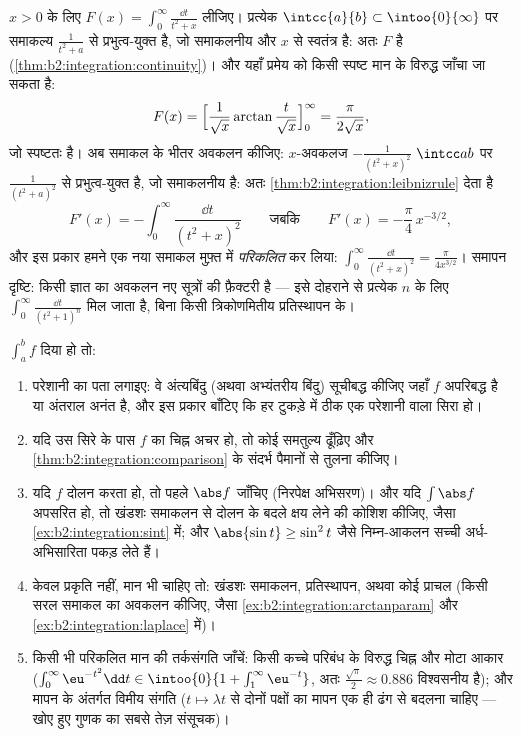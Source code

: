 \begin{example}[किसी सूत्र के विरुद्ध जाँचा गया एक प्राचल समाकल]\label{ex:b2:integration:arctanparam}
$x > 0$ के लिए $F(x) = \displaystyle\int_0^\infty \frac{\dd t}{t^2 + x}$ लीजिए। प्रत्येक $\intcc{a}{b} \subset \intoo{0}{\infty}$ पर समाकल्य $\frac{1}{t^2 + a}$ से प्रभुत्व-युक्त है,
जो समाकलनीय और $x$ से स्वतंत्र है: अतः $F$  है (\cref{thm:b2:integration:continuity})। और यहाँ प्रमेय
को किसी स्पष्ट मान के विरुद्ध जाँचा जा सकता है:
\[
F(x) = \Bigl[\frac{1}{\sqrt x}\arctan\frac{t}{\sqrt
x}\Bigr]_0^\infty = \frac{\pi}{2\sqrt x} ,
\]
जो स्पष्टतः  है। अब समाकल के भीतर अवकलन कीजिए: $x$-अवकलज $-\frac{1}{(t^2+x)^2}$ $\intcc ab$
पर $\frac{1}{(t^2+a)^2}$ से प्रभुत्व-युक्त है, जो समाकलनीय है: अतः \cref{thm:b2:integration:leibnizrule} देता है
\[
F'(x) = -\int_0^\infty \frac{\dd t}{(t^2 + x)^2}
\qquad\text{जबकि}\qquad
F'(x) = -\frac{\pi}{4}\,x^{-3/2} ,
\]
और इस प्रकार हमने एक नया समाकल मुफ़्त में \emph{परिकलित} कर लिया:
$\int_0^\infty\frac{\dd t}{(t^2+x)^2} = \frac{\pi}{4x^{3/2}}$। समापन दृष्टि: किसी ज्ञात  का अवकलन नए सूत्रों की
फ़ैक्टरी है --- इसे दोहराने से प्रत्येक $n$ के लिए $\int_0^\infty\frac{\dd t}{(t^2+1)^n}$ मिल जाता है,
बिना किसी त्रिकोणमितीय प्रतिस्थापन के।
\end{example}

\begin{method}[किसी अनुचित समाकल का अध्ययन]\label{met:b2:integration:study}
$\int_a^b f$ दिया हो तो:
\begin{enumerate}
  \item परेशानी का पता लगाइए: वे अंत्यबिंदु (अथवा अभ्यंतरीय बिंदु)
        सूचीबद्ध कीजिए जहाँ $f$ अपरिबद्ध है या अंतराल अनंत है, और इस
        प्रकार बाँटिए कि हर टुकड़े में ठीक एक परेशानी वाला सिरा हो।
  \item यदि उस सिरे के पास $f$ का चिह्न अचर हो, तो कोई समतुल्य ढूँढ़िए
        और \cref{thm:b2:integration:comparison} के संदर्भ पैमानों से तुलना कीजिए।
  \item यदि $f$ दोलन करता हो, तो पहले $\abs f$ जाँचिए (निरपेक्ष अभिसरण)। और
        यदि $\int\abs f$ अपसरित हो, तो खंडशः समाकलन से दोलन के बदले क्षय लेने की
        कोशिश कीजिए, जैसा \cref{ex:b2:integration:sint} में; और $\abs{\sin t} \geq \sin^2t$ जैसे निम्न-आकलन सच्ची
        अर्ध-अभिसारिता पकड़ लेते हैं।
  \item केवल प्रकृति नहीं, मान भी चाहिए तो: खंडशः समाकलन, प्रतिस्थापन,
        अथवा कोई प्राचल (किसी सरल समाकल का अवकलन कीजिए, जैसा \cref{ex:b2:integration:arctanparam} और \cref{ex:b2:integration:laplace}
        में)।
  \item किसी भी परिकलित मान की तर्कसंगति जाँचें: किसी कच्चे परिबंध के
        विरुद्ध चिह्न और मोटा आकार ($\int_0^\infty
        \eu^{-t^2}\dd t \in \intoo{0}{1 + \int_1^\infty
        \eu^{-t}}$, अतः $\frac{\sqrt\pi}{2} \approx 0.886$ विश्वसनीय है); और
        मापन के अंतर्गत विमीय संगति ($t \mapsto \lambda t$ से दोनों पक्षों का मापन एक ही
        ढंग से बदलना चाहिए --- खोए हुए गुणक का सबसे तेज़ संसूचक)।
\end{enumerate}
\end{method}

